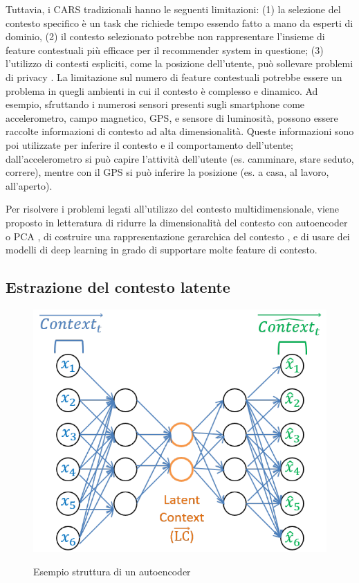 Tuttavia, i CARS tradizionali hanno le seguenti limitazioni: (1) la selezione del contesto specifico è un task che richiede tempo essendo fatto a mano da esperti di dominio, (2) il contesto selezionato potrebbe non rappresentare l'insieme di feature contestuali più efficace per il recommender system in questione; (3) l'utilizzo di contesti espliciti, come la posizione dell'utente, può sollevare problemi di privacy  \cite{context-aware-deep-learning}. La limitazione sul numero di feature contestuali potrebbe essere un problema in quegli ambienti in cui il contesto è complesso e dinamico. Ad esempio, sfruttando i numerosi sensori presenti sugli smartphone come accelerometro, campo magnetico, GPS, e sensore di luminosità, possono essere raccolte informazioni di contesto ad alta dimensionalità. Queste informazioni sono poi utilizzate per inferire il contesto e il comportamento dell'utente; dall'accelerometro si può capire l'attività dell'utente (es. camminare, stare seduto, correre), mentre con il GPS si può inferire la posizione (es. a casa, al lavoro, all'aperto).

Per risolvere i problemi legati all'utilizzo del contesto multidimensionale, viene proposto in letteratura di ridurre la dimensionalità del contesto con autoencoder o PCA \cite{latent-context} \cite{context-autoencoder}, di costruire una rappresentazione gerarchica del contesto \cite{hierarchical-context}, e di usare dei modelli di deep learning in grado di supportare molte feature di contesto\cite{context-aware-deep-learning}.

\subsection{Estrazione del contesto latente} 
\label{ssec:latent-context}
\begin{figure}
 \centering
  \includegraphics[scale=0.65]{immagini/autoencoder.png}
  \caption{Esempio struttura di un autoencoder}
  \cite{hierarchical-context}
  \label{fig:ae}
\end{figure}

